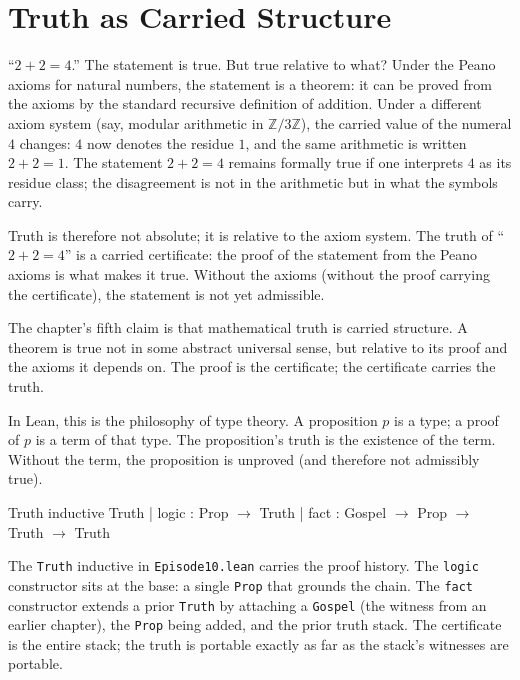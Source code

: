 \section{Truth as Carried Structure}
\label{se:truth-as-carried-structure}

``$2 + 2 = 4$.'' The statement is true. But true relative to what?
Under the Peano axioms for natural numbers, the statement is a
theorem: it can be proved from the axioms by the standard
recursive definition of addition. Under a different axiom system
(say, modular arithmetic in $\mathbb{Z}/3\mathbb{Z}$), the carried
value of the numeral $4$ changes: $4$ now denotes the residue $1$,
and the same arithmetic is written $2 + 2 = 1$. The statement
$2 + 2 = 4$ remains formally true if one interprets $4$ as its
residue class; the disagreement is not in the arithmetic but in
what the symbols carry.

Truth is therefore not absolute; it is relative to the axiom
system. The truth of ``$2 + 2 = 4$'' is a carried certificate:
the proof of the statement from the Peano axioms is what makes
it true. Without the axioms (without the proof carrying the
certificate), the statement is not yet admissible.

The chapter's fifth claim is that mathematical truth is carried
structure. A theorem is true not in some abstract universal sense,
but relative to its proof and the axioms it depends on. The proof
is the certificate; the certificate carries the truth.

In Lean, this is the philosophy of type theory. A proposition $p$
is a type; a proof of $p$ is a term of that type. The
proposition's truth is the existence of the term. Without the
term, the proposition is unproved (and therefore not admissibly
true).

\begin{leanexcerpt}{Truth}
inductive Truth
  | logic : Prop $\to$ Truth
  | fact  : Gospel $\to$ Prop $\to$ Truth $\to$ Truth
\end{leanexcerpt}

The \texttt{Truth} inductive in \texttt{Episode10.lean} carries
the proof history. The \texttt{logic} constructor sits at the
base: a single \texttt{Prop} that grounds the chain. The
\texttt{fact} constructor extends a prior \texttt{Truth} by
attaching a \texttt{Gospel} (the witness from an earlier
chapter), the \texttt{Prop} being added, and the prior truth
stack. The certificate is the entire stack; the truth is portable
exactly as far as the stack's witnesses are portable.

